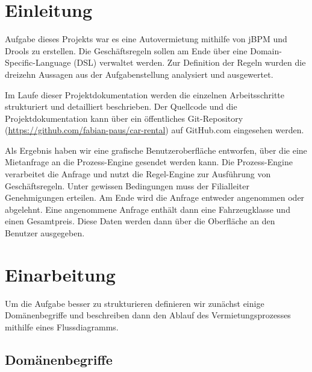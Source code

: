 



\setcounter{secnumdepth}{3}
\setcounter{tocdepth}{2}

\pagestyle{empty}


\tableofcontents
\setcounter{page}{1}

\pagestyle{scrheadings}

\newpage

\section{Einleitung}

Aufgabe dieses Projekts war es eine Autovermietung mithilfe von jBPM und Drools zu erstellen. Die Geschäftsregeln sollen am Ende über eine Domain-Specific-Language (DSL) verwaltet werden. Zur Definition der Regeln wurden die dreizehn Aussagen aus der Aufgabenstellung analysiert und ausgewertet. 

Im Laufe dieser Projektdokumentation werden die einzelnen Arbeitsschritte strukturiert und detailliert beschrieben. Der Quellcode und die Projektdokumentation kann über ein öffentliches Git-Repository (\url{https://github.com/fabian-paus/car-rental}) auf GitHub.com eingesehen werden. 

Als Ergebnis haben wir eine grafische Benutzeroberfläche entworfen, über die eine Mietanfrage an die Prozess-Engine gesendet werden kann. Die Prozess-Engine verarbeitet die Anfrage und nutzt die Regel-Engine zur Ausführung von Geschäftsregeln.
Unter gewissen Bedingungen muss der Filialleiter Genehmigungen erteilen.
Am Ende wird die Anfrage entweder angenommen oder abgelehnt. Eine angenommene Anfrage enthält dann eine Fahrzeugklasse und einen Gesamtpreis. Diese Daten werden dann über die Oberfläche an den Benutzer ausgegeben. 

\section{Einarbeitung}

Um die Aufgabe besser zu strukturieren definieren wir zunächst einige Domänenbegriffe und 
beschreiben dann den Ablauf des Vermietungsprozesses mithilfe eines Flussdiagramms.

\subsection{Domänenbegriffe}

